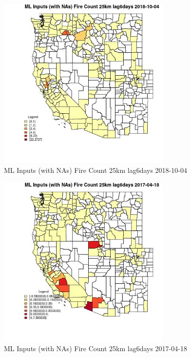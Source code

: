 \begin{figure} 
\centering  
\includegraphics[width=0.77\textwidth]{Code_Outputs/Report_ML_input_PM25_Step4_part_f_de_duplicated_aves_prioritize_24hr_obswNAs_CountyFire_Count_25km_lag6daysMean2018-10-04.jpg} 
\caption{\label{fig:Report_ML_input_PM25_Step4_part_f_de_duplicated_aves_prioritize_24hr_obswNAsCountyFire_Count_25km_lag6daysMean2018-10-04}ML Inputs (with NAs) Fire Count 25km lag6days 2018-10-04} 
\end{figure} 
 

\begin{figure} 
\centering  
\includegraphics[width=0.77\textwidth]{Code_Outputs/Report_ML_input_PM25_Step4_part_f_de_duplicated_aves_prioritize_24hr_obswNAs_CountyFire_Count_25km_lag6daysMean2017-04-18.jpg} 
\caption{\label{fig:Report_ML_input_PM25_Step4_part_f_de_duplicated_aves_prioritize_24hr_obswNAsCountyFire_Count_25km_lag6daysMean2017-04-18}ML Inputs (with NAs) Fire Count 25km lag6days 2017-04-18} 
\end{figure} 
 

